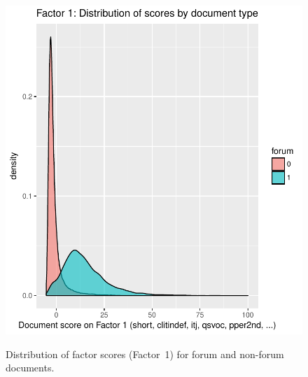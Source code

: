 \begin{figure}
   \includegraphics[scale=.95]{../R/forum-factor1.pdf}
   \label{forum-factor1}
  \caption{Distribution of factor scores (Factor~1) for forum and non-forum documents.}  
\end{figure}





